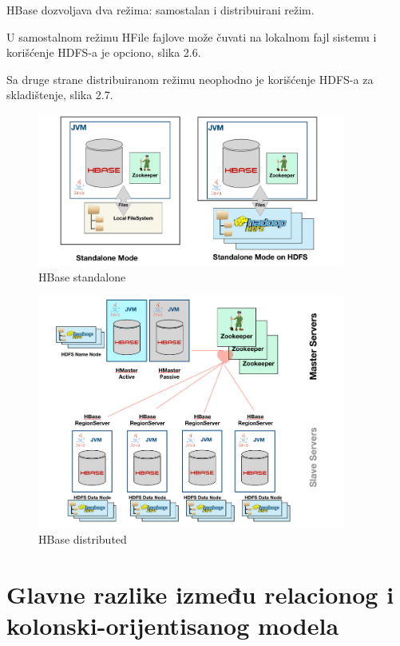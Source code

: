\documentclass[12pt,oneside]{memoir}
\begin{document}
HBase dozvoljava dva režima: samostalan i distribuirani režim.

U samostalnom režimu HFile fajlove može čuvati na lokalnom fajl sistemu i korišćenje HDFS-a je opciono, slika 2.6.

Sa druge strane distribuiranom režimu neophodno je korišćenje HDFS-a za skladištenje, slika 2.7. 

\begin{figure}[!ht]
  \centering
  \includegraphics[width=0.9\textwidth]{hbase-standalone.png}
  \caption{HBase standalone}
  \label{fig:grafikon}
\end{figure}

\begin{figure}[!ht]
  \centering
  \includegraphics[width=0.9\textwidth]{hbase-distributed.png}
  \caption{HBase distributed}
  \label{fig:grafikon}
\end{figure}


\pagebreak

\section{Glavne razlike između relacionog i kolonski-orijentisanog modela}
\end{document}
